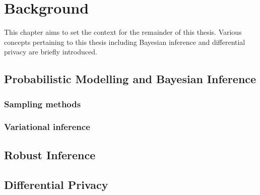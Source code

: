 \chapter{Background}
\label{chap:chap2}

This chapter aims to set the context for the remainder of this thesis. Various concepts pertaining to this thesis including Bayesian inference and differential privacy are briefly introduced.

\section{Probabilistic Modelling and Bayesian Inference}
\label{sec:bbayesian-inference}

\subsection{Sampling methods}
\label{subsec:bsampling-methods}

\subsection{Variational inference}
\label{subsec:bvariational-inference}

\section{Robust Inference}
\label{sec:brobust-inference}

\section{Differential Privacy}
\label{sec:bdifferential-privacy}






